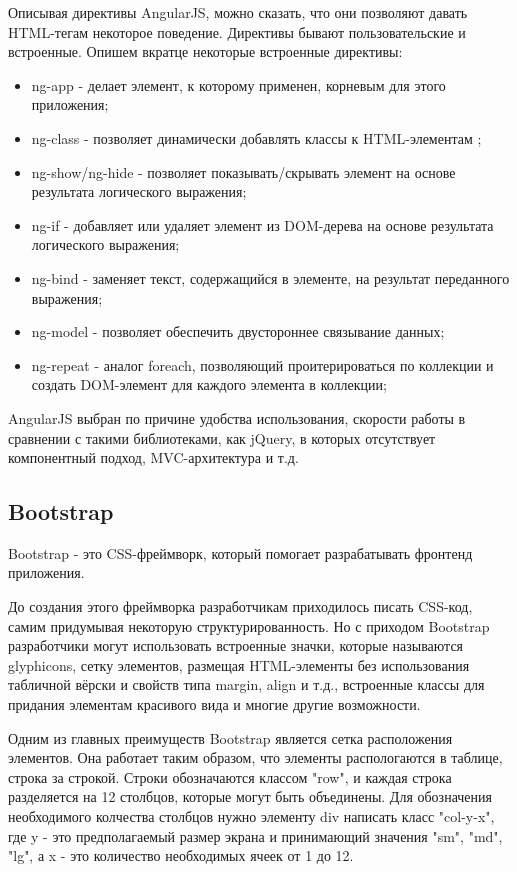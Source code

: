Описывая директивы AngularJS, можно сказать, что они позволяют давать HTML-тегам некоторое поведение. Директивы бывают пользовательские и встроенные. Опишем вкратце некоторые встроенные директивы:

\begin{itemize}
  \item ng-app - делает элемент, к которому применен, корневым для этого приложения;
  \item ng-class - позволяет динамически добавлять классы к HTML-элементам ;
  \item ng-show/ng-hide - позволяет показывать/скрывать элемент на основе результата логического выражения;
  \item ng-if - добавляет или удаляет элемент из DOM-дерева на основе результата логического выражения;
  \item ng-bind - заменяет текст, содержащийся в элементе, на результат переданного выражения;
  \item ng-model - позволяет обеспечить двустороннее связывание данных;
  \item ng-repeat - аналог foreach, позволяющий проитерироваться по коллекции и создать DOM-элемент для каждого элемента в коллекции;
\end{itemize}

AngularJS выбран по причине удобства использования, скорости работы в сравнении с такими библиотеками, как jQuery, в которых отсутствует компонентный подход, MVC-архитектура и т.д.

\subsection{Bootstrap}
\label{sub:technologies:bootstrap}
Bootstrap - это CSS-фреймворк, который помогает разрабатывать фронтенд приложения.

До создания этого фреймворка разработчикам приходилось писать CSS-код, самим придумывая некоторую структурированность. Но с приходом Bootstrap разработчики могут использовать встроенные значки, которые называются glyphicons, сетку элементов, размещая HTML-элементы без использования табличной вёрски и свойств типа margin, align и т.д., встроенные классы для придания элементам красивого вида и многие другие возможности.

Одним из главных преимуществ Bootstrap является сетка расположения элементов. Она работает таким образом, что элементы распологаются в таблице, строка за строкой. Строки обозначаются классом "row", и каждая строка разделяется на 12 столбцов, которые могут быть объединены. Для обозначения необходимого колчества столбцов нужно элементу div написать класс "col-y-x", где y - это предполагаемый размер экрана и принимающий значения "sm", "md", "lg", а x - это количество необходимых ячеек от 1 до 12.

